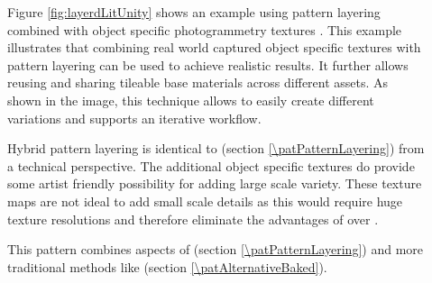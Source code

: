 \begin{description}
	\item[\patExamples]%
	Figure \ref{fig:layerdLitUnity} shows an example using pattern layering combined with object specific photogrammetry textures  \cite{unity2017photogrammetryLayered}. This example illustrates that combining real world captured object specific textures with pattern layering can be used to achieve realistic results. It further allows reusing and sharing tileable base materials across different assets. As shown in the image, this technique allows to easily create different variations and supports an iterative workflow.   		
	\item[\patConsequences]%
	Hybrid pattern layering is identical to \emph{\patPatternLayering} (section \ref{\patPatternLayering}) from a technical perspective. The additional object specific textures do provide some artist friendly possibility for adding large scale variety. These texture maps are not ideal to add small scale details as this would require huge texture resolutions and therefore eliminate the advantages of \emph{\patPatternLayering} over \emph{\patAlternativeBaked}.  
	\item[\patRelations]%
	This pattern combines aspects of \emph{\patPatternLayering} (section \ref{\patPatternLayering}) and more traditional methods like \emph{\patAlternativeBaked} (section \ref{\patAlternativeBaked}).
\end{description}


